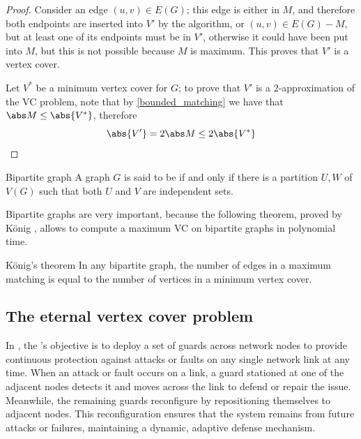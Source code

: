 \documentclass[a4paper, 12pt]{report}
\begin{document}
    \begin{proof}
        Consider an edge $(u, v) \in E(G)$; this edge is either in $M$, and therefore both endpoints are inserted into $V'$ by the algorithm, or $(u, v) \in E(G) - M$, but at least one of its endpoints must be in $V'$, otherwise it could have been put into $M$, but this is not possible because $M$ is maximum. This proves that $V'$ is a vertex cover.

        Let $V^*$ be a minimum vertex cover for $G$; to prove that $V'$ is a 2-approximation of the VC problem, note that by \cref{bounded_matching} we have that $\abs M \le \abs{V^*}$, therefore $$\abs{V'} = 2 \abs M \le 2 \abs{V^*}$$
    \end{proof}

    \begin{frameddefn}{Bipartite graph}
        A graph $G$ is said to be  if and only if there is a partition $U, W$ of $V(G)$ such that both $U$ and $V$ are independent sets.
    \end{frameddefn}

    Bipartite graphs are very important, because the following theorem, proved by König \cite{konig}, allows to compute a maximum VC on bipartite graphs in polynomial time.

    \begin{framedthm}{König's theorem}
        In any bipartite graph, the number of edges in a maximum matching is equal to the number of vertices in a minimum vertex cover.
    \end{framedthm}

    \subsection{The eternal vertex cover problem}

    In , the 's objective is to deploy a  set of guards across network nodes to provide continuous protection against attacks or faults on any single network link at any time. When an attack or fault occurs on a link, a guard stationed at one of the adjacent nodes detects it and  moves across the link to defend or repair the issue. Meanwhile, the remaining guards reconfigure by repositioning themselves to adjacent nodes. This reconfiguration ensures that the system remains  from future attacks or failures, maintaining a dynamic, adaptive defense mechanism.
\end{document}
